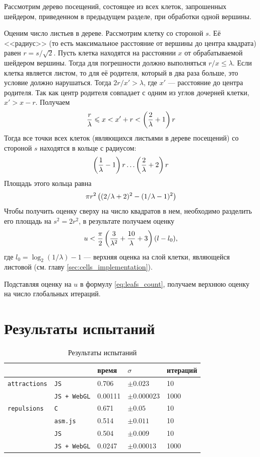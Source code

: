 Рассмотрим дерево посещений, состоящее из всех клеток, запрошенных шейдером, приведенном в предыдущем разделе, при обработки одной вершины.

Оценим число листьев в дереве. Рассмотрим клетку со стороной $s$. Её <<радиус>> (то есть максимальное расстояние от вершины до центра квадрата) равен $r = s / \sqrt{2}$. Пусть клетка находятся на расстоянии $x$ от обрабатываемой шейдером вершины. Тогда для погрешности должно выполняться $r / x \le \lambda$. Если клетка является листом, то для её родителя, который в два раза больше, это условие должно нарушаться. Тогда $2r / x' > \lambda$, где $x'$ --- расстояние до центра родителя. Так как центр родителя совпадает с одним из углов дочерней клетки, $x' > x - r$. Получаем
$$\frac{r}{\lambda} \leqslant x < x' + r < \left(\frac{2}{\lambda} + 1\right) r$$
Тогда все точки всех клеток (являющихся листьями в дереве посещений) со стороной $s$ находятся в кольце с радиусом:
$$\left(\frac{1}{\lambda} - 1\right) r \ldots \left(\frac{2}{\lambda} + 2\right) r$$
Площадь этого кольца равна
$$\pi r^2 \left((2 / \lambda + 2)^2 - (1/\lambda - 1)^2\right)$$
Чтобы получить оценку сверху на число квадратов в нем, необходимо разделить его площадь на $s^2 = 2r^2$, в результате получаем оценку
$$u < \frac{\pi}{2}\left(\frac{3}{\lambda^2} + \frac{10}{\lambda} + 3\right) (l - l_0),$$
где $l_0 = \log_2(1 / \lambda) - 1$ --- верхняя оценка на слой клетки, являющейся листовой (см. главу \ref{sec:cells_implementation}).

Подставляя оценку на $u$ в формулу \ref{eq:leafs_count}, получаем верхнюю оценку на число глобальных итераций.

\section{Результаты испытаний}

\begin{table}[t]
  \centering
  \begin{tabular}{|l l l l l|}
    \hline
     &  & время & $\sigma$ & итераций \\ \hline
    \texttt{attractions} & \texttt{JS} & 0.706 & $\pm 0.023$ & 10 \\ \cline{2-5}
             & \texttt{JS + WebGL} & 0.00111 & $\pm 0.000023$ & 1000 \\\hline
    \texttt{repulsions} & \texttt{C} & 0.671 & $\pm 0.05$ & 10 \\ \cline{2-5}
     & \texttt{asm.js} & 0.514 & $\pm 0.011$ & 10 \\\cline{2-5}
     & \texttt{JS} & 0.504 & $\pm 0.009$ & 10 \\\cline{2-5}
             & \texttt{JS + WebGL} & 0.0247 & $\pm 0.00013$ & 1000 \\\hline
  \end{tabular}
  \caption{Результаты испытаний}
  \label{tab:myfirsttable}
\end{table}

